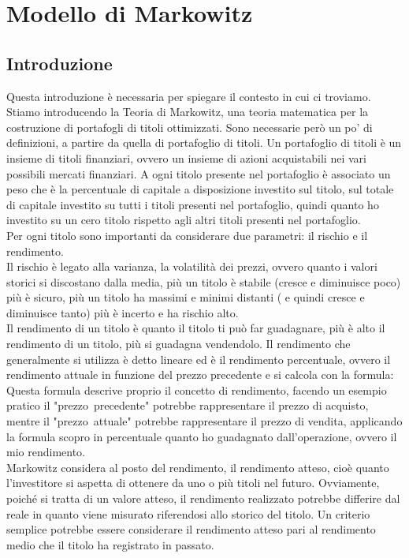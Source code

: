 \chapter{Modello di Markowitz}
\section{Introduzione}
Questa introduzione è necessaria per spiegare il contesto in cui ci troviamo. Stiamo introducendo la Teoria di Markowitz, una teoria matematica per la costruzione di portafogli di titoli ottimizzati. Sono necessarie però un po’ di definizioni, a partire da quella di portafoglio di titoli.
Un portafoglio di titoli è un insieme di titoli finanziari, ovvero un insieme di azioni acquistabili nei vari possibili mercati finanziari. A ogni titolo presente nel portafoglio è associato un peso che è la percentuale di capitale a disposizione investito sul titolo, sul totale di capitale investito su tutti i titoli presenti nel portafoglio, quindi quanto ho investito su un cero titolo rispetto agli altri titoli presenti nel portafoglio.\\
Per ogni titolo sono importanti da considerare due parametri: il rischio e il rendimento.\\
Il rischio è legato alla varianza, la volatilità dei prezzi, ovvero quanto i valori storici si discostano dalla media, più un titolo è stabile (cresce e diminuisce poco) più è sicuro, più un titolo ha massimi e minimi distanti ( e quindi cresce e diminuisce tanto) più è incerto e ha rischio alto.\\
Il rendimento di un titolo è quanto il titolo ti può far guadagnare, più è alto il rendimento di un titolo, più si guadagna vendendolo. Il rendimento che generalmente si utilizza è detto lineare ed è il rendimento percentuale, ovvero il rendimento attuale in funzione del prezzo precedente e si calcola con la formula:\\
\noindent
Questa formula descrive proprio il concetto di rendimento, facendo un esempio pratico il "prezzo~precedente" potrebbe rappresentare il prezzo di acquisto, mentre il "prezzo~attuale" potrebbe rappresentare il prezzo di vendita, applicando la formula scopro in percentuale quanto ho guadagnato dall'operazione, ovvero il mio rendimento.\\
Markowitz considera al posto del rendimento, il rendimento atteso, cioè quanto l’investitore si aspetta di ottenere da uno o più titoli nel futuro. Ovviamente, poiché si tratta di un valore atteso, il rendimento realizzato potrebbe differire dal reale in quanto viene misurato riferendosi allo storico del titolo. Un criterio semplice potrebbe essere considerare il rendimento atteso pari al rendimento medio che il titolo ha registrato in passato. \\
